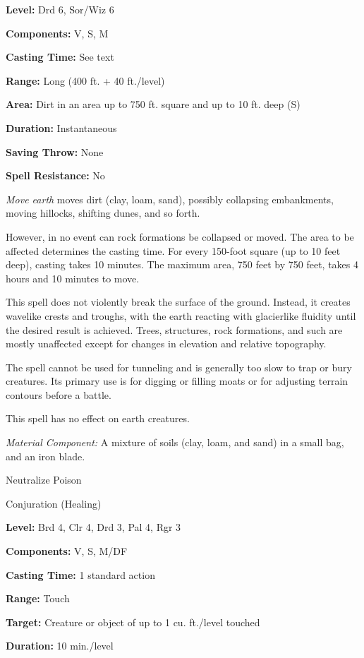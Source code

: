 \documentclass{article}
\begin{document}
\textbf{Level:} Drd 6, Sor/Wiz 6

\textbf{Components:} V, S, M

\textbf{Casting Time:} See text

\textbf{Range:} Long (400 ft. + 40 ft./level)

\textbf{Area:} Dirt in an area up to 750 ft. square and up to 10 ft. deep (S)

\textbf{Duration:} Instantaneous

\textbf{Saving Throw:} None

\textbf{Spell Resistance:} No

\textit{Move earth }moves dirt (clay, loam, sand), possibly collapsing embankments, 
moving hillocks, shifting dunes, and so forth.

However, in no event can rock formations be collapsed or moved. The area to be 
affected determines the casting time. For every 150-foot square (up to 10 feet 
deep), casting takes 10 minutes. The maximum area, 750 feet by 750 feet, takes 
4 hours and 10 minutes to move.

This spell does not violently break the surface of the ground. Instead, it creates 
wavelike crests and troughs, with the earth reacting with glacierlike fluidity 
until the desired result is achieved. Trees, structures, rock formations, and such 
are mostly unaffected except for changes in elevation and relative topography.

The spell cannot be used for tunneling and is generally too slow to trap or bury 
creatures. Its primary use is for digging or filling moats or for adjusting terrain 
contours before a battle.

This spell has no effect on earth creatures.

\textit{Material Component: }A mixture of soils (clay, loam, and sand) in a small 
bag, and an iron blade.

\vspace{12pt}
Neutralize Poison

Conjuration (Healing)

\textbf{Level:} Brd 4, Clr 4, Drd 3, Pal 4, Rgr 3

\textbf{Components:} V, S, M/DF

\textbf{Casting Time:} 1 standard action

\textbf{Range:} Touch

\textbf{Target:} Creature or object of up to 1 cu. ft./level touched

\textbf{Duration:} 10 min./level
\end{document}
